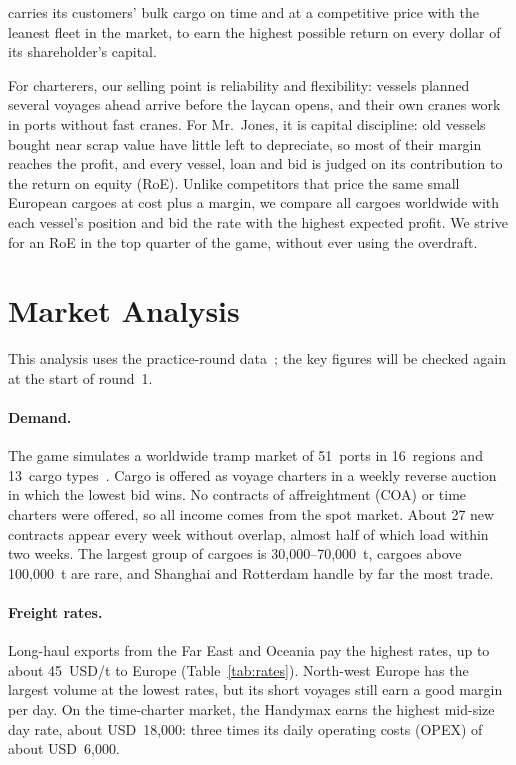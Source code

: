 \begin{mission}
\company{} carries its customers' bulk cargo on time and at a competitive price with the leanest fleet in the market, to earn the highest possible return on every dollar of its shareholder's capital.
\end{mission}
\noindent For charterers, our selling point is reliability and flexibility: vessels planned several voyages ahead arrive before the laycan opens, and their own cranes work in ports without fast cranes. For Mr.\ Jones, it is capital discipline: old vessels bought near scrap value have little left to depreciate, so most of their margin reaches the profit, and every vessel, loan and bid is judged on its contribution to the return on equity (RoE). Unlike competitors that price the same small European cargoes at cost plus a margin, we compare all cargoes worldwide with each vessel's position and bid the rate with the highest expected profit. We strive for an RoE in the top quarter of the game, without ever using the overdraft.

\section{Market Analysis}\label{sec:market}

This analysis uses the practice-round data~\cite{MBGpractice}; the key figures will be checked again at the start of round~1.

\paragraph{Demand.} The game simulates a worldwide tramp market of 51~ports in 16~regions and 13~cargo types~\cite{MBGrefmanual}. Cargo is offered as voyage charters in a weekly reverse auction in which the lowest bid wins. No contracts of affreightment (COA) or time charters were offered, so all income comes from the spot market. About 27 new contracts appear every week without overlap, almost half of which load within two weeks. The largest group of cargoes is 30,000--70,000~t, cargoes above 100,000~t are rare, and Shanghai and Rotterdam handle by far the most trade.

\paragraph{Freight rates.} Long-haul exports from the Far East and Oceania pay the highest rates, up to about 45~USD/t to Europe (Table~\ref{tab:rates}). North-west Europe has the largest volume at the lowest rates, but its short voyages still earn a good margin per day. On the time-charter market, the Handymax earns the highest mid-size day rate, about USD~18,000: three times its daily operating costs (OPEX) of about USD~6,000.

